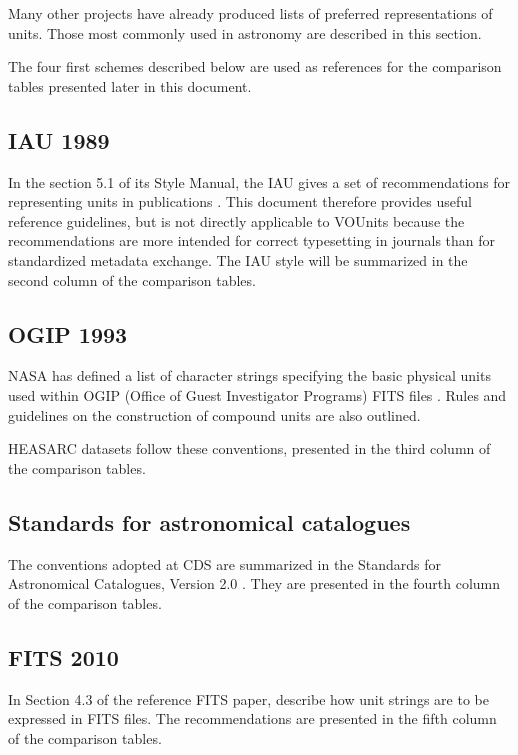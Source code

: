 \documentclass[11pt,notitlepage,onecolumn]{ivoa}
\begin{document}
Many other projects have already produced lists of preferred
representations of units. Those most commonly used in
astronomy are described in this section. 

The four first schemes described below are used as references for the
comparison tables presented later in this document.

\subsection{IAU 1989\label{appx:IAU}}

In the section 5.1 of its Style Manual, the IAU gives a set
of recommendations for representing units in publications \citep{wilkins89}. This document
therefore provides useful reference guidelines, but is not directly
applicable to VOUnits because the recommendations are more intended
for correct typesetting in journals than for standardized metadata exchange.
The IAU style will be summarized in the second column of the comparison tables.

\subsection{OGIP 1993}

NASA has defined a list of character strings specifying the basic physical units 
used within OGIP (Office of Guest Investigator Programs) FITS files \citep{george95}. Rules and guidelines on the construction 
of compound units are also outlined. 

HEASARC datasets follow these conventions, presented in the third column
of the comparison tables.

\subsection{Standards for astronomical catalogues}

The conventions adopted at CDS are summarized in the Standards for Astronomical 
Catalogues, Version 2.0 \citep[\S3.2]{cds00}. They are presented in the fourth column
of the comparison tables.

\subsection{FITS 2010}

In Section 4.3 of the reference FITS paper, \citet{pence10} describe how unit strings are to be expressed in
FITS files. The recommendations are presented in the fifth column
of the comparison tables.
\end{document}

